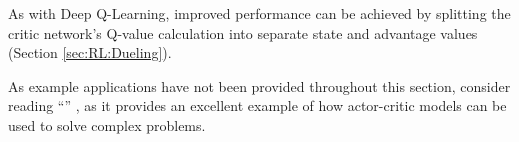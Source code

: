 As with Deep Q-Learning, improved performance can be achieved by splitting the
critic network's Q-value calculation into separate state and advantage values
(Section \ref{sec:RL:Dueling}).

As example applications have not been provided throughout this section, consider
reading ``'' \citep{Peng:2017:Deeploco}, as it
provides an excellent example of how actor-critic models can be used to solve
complex problems.

